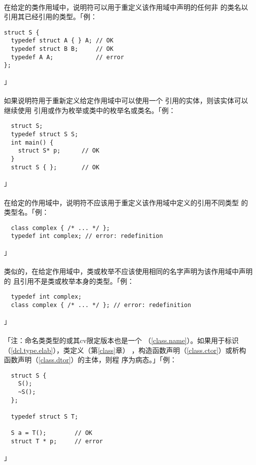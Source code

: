 \paragraph{}
在给定的类作用域中，说明符可以用于重定义该作用域中声明的任何非
的类名以引用其已经引用的类型。「例：
\begin{lstlisting}
struct S {
  typedef struct A { } A; // OK
  typedef struct B B;     // OK
  typedef A A;            // error
};
\end{lstlisting}」

\paragraph{}
如果说明符用于重新定义给定作用域中可以使用一个
引用的实体，则该实体可以继续使用
引用或作为枚举或类中的枚举名或类名。「例：
\begin{lstlisting}
  struct S;
  typedef struct S S;
  int main() {
    struct S* p;      // OK
  }
  struct S { };       // OK
\end{lstlisting}」

\paragraph{}
在给定的作用域中，说明符不应该用于重定义该作用域中定义的引用不同类型
的类型名。「例：
\begin{lstlisting}
  class complex { /* ... */ };
  typedef int complex; // error: redefinition
\end{lstlisting}」

\paragraph{}
类似的，在给定作用域中，类或枚举不应该使用相同的名字声明为该作用域中声明的
且引用不是类或枚举本身的类型。「例：
\begin{lstlisting}
  typedef int complex;
  class complex { /* ... */ }; // error: redefinition
\end{lstlisting}」

\paragraph{}
「注：命名类类型的或其cv限定版本也是一个
（\ref{class.name}）。如果用于标识
（\ref{dcl.type.elab}），类定义（第\ref{class}章）
，构造函数声明（\ref{class.ctor}）或析构函数声明（\ref{class.dtor}）的主体，则程
序为病态。」「例：
\begin{lstlisting}
  struct S {
    S();
    ~S();
  };

  typedef struct S T;

  S a = T();        // OK
  struct T * p;     // error
\end{lstlisting}」

